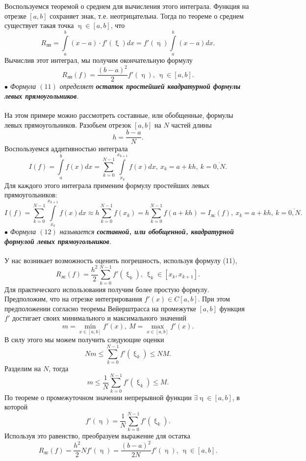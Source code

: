\documentclass[a4paper, 12pt]{report}
\numberwithin{equation}{section}
\renewcommand{\leq}{\leqslant}
\renewcommand{\eta}{\upeta}
\renewcommand{\xi}{\upxi}
\begin{document}
	 Воспользуемся теоремой о среднем для вычисления этого интеграла. Функция на отрезке $[a,b]$ сохраняет знак, т.е. неотрицательна. Тогда по теореме о среднем существует такая точка $\eta \in [a,b]$, что $$R_\text{лп}  = \int\limits_a^b(x-a)\cdot f'(\xi)dx = f'(\eta)\int\limits_a^b(x-a)dx.$$
	 Вычислив этот интеграл, мы получим окончательную формулу \begin{equation}
	 	R_\text{лп} (f) = \dfrac{(b-a)^2}{2}f'(\eta), \ \eta \in [a,b].
	 \end{equation} $\bullet$ \textit{Формула $(11)$ определяет \textbf{остаток простейшей квадратурной формулы левых прямоугольников}.}\\\\
	 На этом примере можно рассмотреть составные, или обобщенные, формулы левых прямоугольников. Разобьем отрезок $[a,b]$ на $N$ частей длины $$h = \dfrac{b-a}{N}.$$
	 Воспользуемся аддитивностью интеграла $$I(f) = \int\limits_a^b f(x)dx = \sum_{k=0}^{N-1}\int\limits_{x_k}^{x_{k+1}}f(x)dx,\ x_k = a+kh,\ k = \overline{0, N}.$$
	 Для каждого этого интеграла применим формулу простейших левых прямоугольников:
	 \begin{equation}
	 	I(f) =\sum_{k=0}^{N-1}\int\limits_{x_k}^{x_{k+1}}f(x)dx\approx h\sum_{k=0}^{N-1} f(x_k) = h\sum_{k=0}^{N-1} f(a+kh) = I_\text{лс}(f),\ x_k = a+kh,\ k = \overline{0, N}.
	 \end{equation}
	 $\bullet$ \textit{Формула $(12)$ называется \textbf{составной, или обобщенной, квадратурной формулой левых прямоугольников}.}\\\\
	 У нас возникает возможность оценить погрешность, используя формулу (11), $$R_\text{лс}(f) = \dfrac{h^2}{2}\sum_{k=0}^{N-1}f'(\xi_k),\ \xi_k \in [x_k, x_{k+1}].$$
	 Для практического использования получим более простую формулу. Предположим, что на отрезке интегрирования $f'(x)\in C[a,b]$. При этом предположении согласно теоремы Вейерштрасса на промежутке $[a,b]$ функция $f'$ достигает своих минимального и максимального значений $$m = \underset{x\in[a,b]}{\min}f'(x),\ M = \underset{x\in[a,b]}{\max}f'(x).$$
	 В силу этого мы можем получить следующие оценки $$Nm \leq \sum_{k=0}^{N-1}f'(\xi_k)\leq NM.$$
	 Разделим на $N$, тогда $$m\leq \dfrac{1}{N}\sum_{k=0}^{N-1}f'(\xi_k)\leq M.$$
	 По теореме о промежуточном значении непрерывной функции $\exists \eta \in [a,b]$, в которой $$f'(\eta) = \dfrac{1}{N}\sum_{k=0}^{N-1}f'(\xi_k).$$
	 Используя это равенство, преобразуем выражение для остатка \begin{equation}
	 	R_\text{лс}(f) = \dfrac{h^2}{2}N f'(\eta) = \dfrac{(b-a)^2}{2N}f'(\eta),\ \eta \in [a,b].
	 \end{equation}
\end{document}
